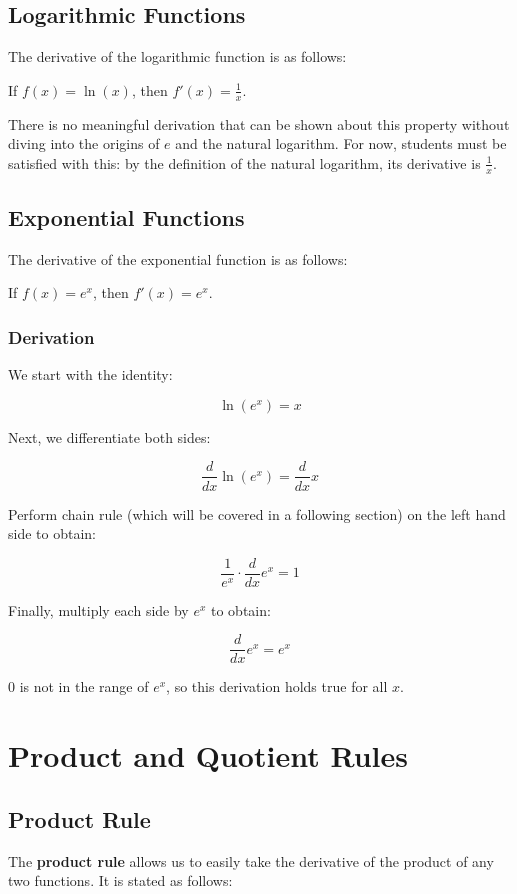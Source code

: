 \documentclass[11pt]{article}
\begin{document}
\subsection{Logarithmic Functions}
The derivative of the logarithmic function is as follows: 

\begin{center}
If $f(x) = \ln(x)$, then $f'(x) = \frac{1}{x}$.
\end{center}

There is no meaningful derivation that can be shown about this property without diving into the origins of $e$ and the natural logarithm. For now, students must be satisfied with this: by the definition of the natural logarithm, its derivative is $\frac{1}{x}$.

\subsection{Exponential Functions}
The derivative of the exponential function is as follows:

\begin{center}
If $f(x) = e^x$, then $f'(x) = e^x$.
\end{center}

\subsubsection{Derivation}
We start with the identity: 

\[ \ln(e^x) = x \]

Next, we differentiate both sides:

\[ \frac{d}{dx} \ln(e^x) = \frac{d}{dx} x \]

Perform chain rule (which will be covered in a following section) on the left hand side to obtain:

\[\frac{1}{e^x} \cdot \frac{d}{dx} e^x = 1\]

Finally, multiply each side by $e^x$ to obtain:

\[\frac{d}{dx} e^x = e^x\]

$0$ is not in the range of $e^x$, so this derivation holds true for all $x$.





\section{Product and Quotient Rules}
\subsection{Product Rule}
The \textbf{product rule} allows us to easily take the derivative of the product of any two functions. It is stated as follows: 
\end{document}

